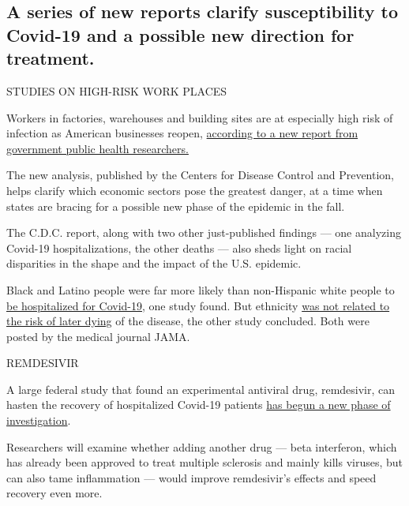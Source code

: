 \hypertarget{a-series-of-new-reports-clarify-susceptibility-to-covid-19-and-a-possible-new-direction-for-treatment}{%
\subsection{A series of new reports clarify susceptibility to Covid-19
and a possible new direction for
treatment.}\label{a-series-of-new-reports-clarify-susceptibility-to-covid-19-and-a-possible-new-direction-for-treatment}}

STUDIES ON HIGH-RISK WORK PLACES

Workers in factories, warehouses and building sites are at especially
high risk of infection as American businesses reopen,
\href{https://www.cdc.gov/mmwr/volumes/69/wr/mm6933e3.htm?s_cid=mm6933e3_w}{according
to a new report from government public health researchers.}

The new analysis, published by the Centers for Disease Control and
Prevention, helps clarify which economic sectors pose the greatest
danger, at a time when states are bracing for a possible new phase of
the epidemic in the fall.

The C.D.C. report, along with two other just-published findings --- one
analyzing Covid-19 hospitalizations, the other deaths --- also sheds
light on racial disparities in the shape and the impact of the U.S.
epidemic.

Black and Latino people were far more likely than non-Hispanic white
people to
\href{https://jamanetwork.com/journals/jamainternalmedicine/fullarticle/2769369?mc_source=MTExMDY2Ojo6NDc2NmI5NDJmZjI1NGU2MWE3MmI0NzA0MGJlZDg0NTQ6OnYzOjoxNTk3Njg1Mjg0Ojox}{be
hospitalized for Covid-19}, one study found. But ethnicity
\href{https://jamanetwork.com/journals/jamanetworkopen/fullarticle/2769387?utm_source=For_The_Media\&utm_medium=referral\&utm_campaign=ftm_links\&utm_term=081820}{was
not related to the risk of later dying} of the disease, the other study
concluded. Both were posted by the medical journal JAMA.

REMDESIVIR

A large federal study that found an experimental antiviral drug,
remdesivir, can hasten the recovery of hospitalized Covid-19 patients
\href{https://www.nytimes3xbfgragh.onion/2020/08/18/health/Covid-treatments-remdesivir.html}{has
begun a new phase of investigation}.

Researchers will examine whether adding another drug --- beta
interferon, which has already been approved to treat multiple sclerosis
and mainly kills viruses, but can also tame inflammation --- would
improve remdesivir's effects and speed recovery even more.

